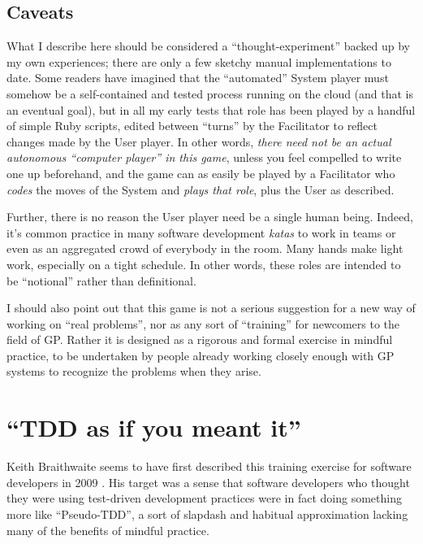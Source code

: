 \subsection{Caveats}\hypertarget{caveats}{}\label{caveats}

What I describe here should be considered a ``thought-experiment'' backed up by my own experiences; there are only a few sketchy manual implementations to date. Some readers have imagined that the ``automated'' System player must somehow be a self-contained and tested process running on the cloud (and that is an eventual goal), but in all my early tests that role has been played by a handful of simple Ruby scripts, edited between ``turns'' by the Facilitator to reflect changes made by the User player. In other words, \emph{there need not be an actual autonomous ``computer player'' in this game}, unless you feel compelled to write one up beforehand, and the game can as easily be played by a Facilitator who \emph{codes} the moves of the System and \emph{plays that role}, plus the User as described.

Further, there is no reason the User player need be a single human being. Indeed, it's common practice in many software development \emph{katas} to work in teams or even as an aggregated crowd of everybody in the room. Many hands make light work, especially on a tight schedule. In other words, these roles are intended to be ``notional'' rather than definitional.

I should also point out that this game is not a serious suggestion for a new way of working on ``real problems'', nor as any sort of ``training'' for newcomers to the field of GP. Rather it is designed as a rigorous and formal exercise in mindful practice, to be undertaken by people already working closely enough with GP systems to recognize the problems when they arise.

\section{``TDD as if you meant it''}\hypertarget{tdd-as-if-you-meant-it}{}\label{tdd-as-if-you-meant-it}

Keith Braithwaite seems to have first described this training exercise for software developers in 2009 \citep{Braithwaite2011}. His target was a sense that software developers who thought they were using test-driven development practices \citep{Beck2002} were in fact doing something more like ``Pseudo-TDD'', a sort of slapdash and habitual approximation lacking many of the benefits of mindful practice.

